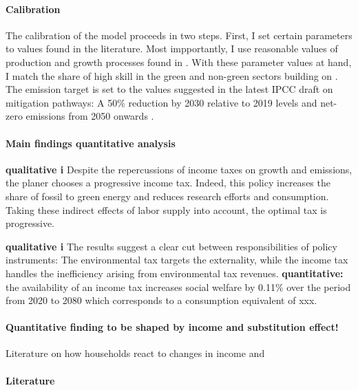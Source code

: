 \paragraph{Calibration}
The calibration of the model proceeds in two steps. First, I set certain parameters to values found in the literature. Most impportantly, I use reasonable values of production and growth processes found in \cite{Fried2018ClimateAnalysis}. %
With these parameter values at hand, I match the share of high skill in the green and non-green sectors building on \cite{Consoli2016DoCapital}. The emission target is set to the values suggested in the latest IPCC draft on mitigation pathways: A 50\% reduction by 2030 relative to 2019 levels and  net-zero emissions from 2050 onwards \citep{IPCC2022}.

\paragraph{Main findings quantitative analysis}
\textbf{qualitative i}
Despite the repercussions of income taxes on growth and emissions, the planer chooses a progressive income tax. 
Indeed, this policy increases the share of fossil to green energy and reduces research efforts and consumption. Taking these indirect effects of labor supply into account, the optimal tax is progressive. 

\textbf{qualitative i}
The results suggest a clear cut between responsibilities of policy instruments: The environmental tax targets the externality, while the income tax handles the inefficiency arising from environmental tax revenues.
\textbf{quantitative:} the availability of an income tax increases social welfare by 0.11\% over the period from 2020 to 2080 which corresponds to a consumption equivalent of xxx. 

\paragraph{Quantitative finding to be shaped by income and substitution effect!}
Literature on how households react to changes in income \cite{Bick2018HowImplications} and \cite{Boppart2019LaborPerspectiveb}


\paragraph{Literature}
